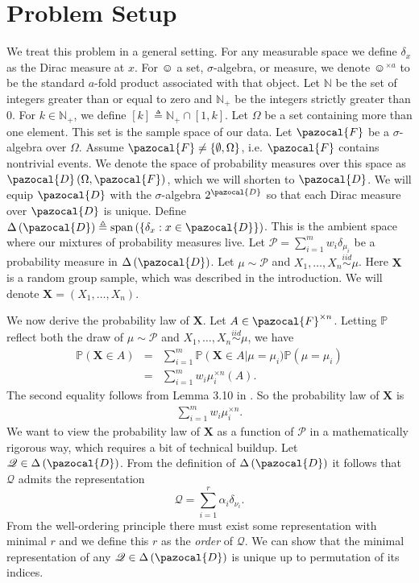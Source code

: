\documentclass[aos,preprint]{imsart}
\def\nn{\mathbb{N}}
\def\l{\left}
\def\r{\right}
\def\sF{\pazocal{F}}
\def\sD{\pazocal{D}}
\def\sP{\mathscr{P}}
\def\sQ{\mathscr{Q}}
\def\bX{\mathbf{X}}
\def\pr{\mathbb{P}}
\def\dd{\Delta\left( \sD \right)}
\def\simiid{\overset{iid}{\sim}}
\def\spn{\operatorname{span}}
\theoremstyle{plain}
\theoremstyle{defintion}
\begin{document}
	\section{Problem Setup} 
	We treat this problem in a general setting. For any measurable space we define $\delta_x$ as the Dirac measure at $x$. For $\smiley$ a set, $\sigma$-algebra, or measure, we denote $\smiley^{\times a}$ to be the standard $a$-fold product associated with that object. Let $\nn$ be the set of integers greater than or equal to zero and $\nn_+$ be the integers strictly greater than 0. For $k \in \nn_+$, we define $\left[ k \right] \triangleq \mathbb{N_+} \cap \left[ 1,k \right]$.
	Let $\Omega$ be a set containing more than one element. This set is the sample space of our data. Let $\sF$ be a $\sigma$-algebra over $\Omega$. Assume $\sF \neq \left\{ \emptyset, \Omega \right\}$, i.e. $\sF$ contains nontrivial events. We denote the space of probability measures over this space as $\sD\left( \Omega,\sF \right)$, which we will shorten to $\sD$. We will equip $\sD$ with the $\sigma$-algebra $2^\sD$ so that each Dirac measure over $\sD$ is unique. Define $\dd \triangleq \spn \left( \l\{\delta_x: x \in \sD \r\}\right)$. This is the ambient space where our mixtures of probability measures live. Let $\sP = \sum_{i=1}^m  w_i \delta_{\mu_i}$ be a probability measure in $\dd$. Let $\mu\sim \sP$ and $X_1 ,\ldots, X_n \simiid \mu$. Here $\bX$ is a random group sample, which was described in the introduction. We will denote $\bX = \left( X_1,\ldots,X_n \right)$.

	We now derive the probability law of $\bX$. Let $A\in \sF^{\times n}$. Letting $\pr$ reflect both the draw of $\mu\sim \sP$ and $X_1,\ldots,X_n \simiid \mu$, we have
	\begin{eqnarray*}
		\pr\left(\bX \in A \right)
		&=& \sum_{i=1}^m \pr\left( \bX \in A \right|\mu=\mu_i) \pr\left( \mu=\mu_i \right)\\
	 &=&  \sum_{i=1}^m w_i \mu_i^{\times n}\left( A \right).
	\end{eqnarray*}
	The second equality follows from Lemma 3.10 in \cite{fomp}.
	So the probability law of $\bX$ is 
	\begin{eqnarray}
		\label{xdens}
		\sum_{i=1}^m w_i \mu_i^{\times n}. 
	\end{eqnarray}
	We want to view the probability law of $\bX$ as a function of $\sP$ in a mathematically rigorous way, which requires a bit of technical buildup.
	Let $\sQ\in \dd$. From the definition of $\dd$ it follows that $\sQ$ admits the representation $$\sQ = \sum_{i=1}^r \alpha_i\delta_{\nu_i} .$$
	From the well-ordering principle there must exist some representation with minimal $r$ and we define this $r$ as the {\it order} of $\sQ$. We can show that the minimal representation of any $\sQ \in \dd$ is unique up to permutation of its indices.
\end{document}
